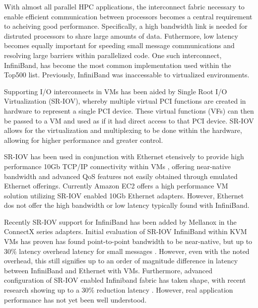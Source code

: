 \documentclass[times,10pt,twocolumn,conference]{IEEEtran}
\begin{document}
With almost all parallel HPC applications, the interconnect fabric necessary to enable efficient communication between processors becomes a central requirement to acheiving good performance. Specifically, a high bandwidth link is needed for distruted processors to share large amounts of data. Futhermore, low latency becomes equally important for speeding small message communications and resolving large barriers within parallelized code. One such interconnect, InfiniBand, has become the most common implementation used within the Top500 list. Previously, InfiniBand was inaccessable to virtualized environments.  

Supporting I/O interconnects in VMs has been aided by Single Root I/O Virtualization (SR-IOV), whereby multiple virtual PCI functions are created in hardware to represent a single PCI device. These virtual functions (VFs) can then be passed to a VM and used as if it had direct access to that PCI device. SR-IOV allows for the virtualization and multiplexing to be done within the hardware, allowing for higher performance and greater control. 

SR-IOV has been used in conjunction with Ethernet etensively to provide high performance 10Gb TCP/IP connectivity within VMs \cite{noidea}, offering near-native bandwidth and advanced QoS features not easily obtained through emulated Ethernet offerings. Currently Amazon EC2 offers a high performance VM solution utilizing SR-IOV enabled 10Gb Ethernet adapters. However, Ethernet dos not offer the high bandwidth or low latency typically found with InfiniBand. 

Recently SR-IOV support for InfiniBand has been added by Mellanox in the ConnectX series adapters. Initial evaluation of SR-IOV InfiniBand within KVM VMs has proven has found point-to-point bandwidth to be near-native, but up to 30\% latency overhead  latency for small messages \cite{SRIOVInfiniBand, panda, fermiIB}. However, even with the noted overhead, this still signifies up to an order of magnitude difference in latency between InfiniBand and Ethernet with VMs. Furthermore, advanced configuration of SR-IOV enabled Infiniband fabric has taken shape, with recent research showing up to a 30\% reduction latency \cite{musleh2014}. However, real application performance has not yet been well understood. 







\end{document}
